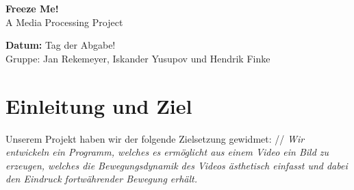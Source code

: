 \documentclass[12pt]{scrartcl}
\begin{document}
\hspace{-0.4cm}\huge \textbf{Freeze Me!}\vspace{3pt}\\\Large A Media Processing Project \vspace{14pt}\large 

\noindent
\textbf{Datum:} Tag der Abgabe! \\ 

\vspace{3pt} \normalsize Gruppe: 
Jan Rekemeyer, Iskander Yusupov und Hendrik Finke

\section{Einleitung und Ziel}
Unserem Projekt haben wir der folgende Zielsetzung gewidmet: //
\textit{Wir entwickeln ein Programm, welches es ermöglicht aus einem Video ein Bild zu erzeugen, welches die Bewegungsdynamik des Videos ästhetisch einfasst und dabei den Eindruck fortwährender Bewegung erhält.}
\end{document}
